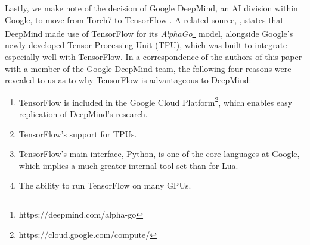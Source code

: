 Lastly, we make note of the decision of Google DeepMind, an AI division within
Google, to move from Torch7 to TensorFlow \cite{deepmind}. A related source,
\cite{tpu}, states that DeepMind made use of TensorFlow for its
\emph{AlphaGo}\footnote{https://deepmind.com/alpha-go} model, alongside Google's
newly developed Tensor Processing Unit (TPU), which was built to integrate
especially well with TensorFlow. In a correspondence of the authors of this
paper with a member of the Google DeepMind team, the following four reasons were
revealed to us as to why TensorFlow is advantageous to DeepMind:

\begin{enumerate}
\item TensorFlow is included in the Google Cloud
  Platform\footnote{https://cloud.google.com/compute/}, which enables easy
  replication of DeepMind's research.
\item TensorFlow's support for TPUs.
\item TensorFlow's main interface, Python, is one of the core languages at
  Google, which implies a much greater internal tool set than for Lua.
\item The ability to run TensorFlow on many GPUs.
\end{enumerate}

